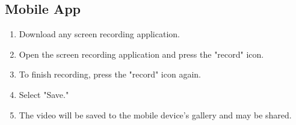 \subsection{Mobile App}
\begin{enumerate}
    \item Download any screen recording application. 
    \item Open the screen recording application and press the "record" icon.
    \item To finish recording, press the "record" icon again. 
    \item Select "Save."
    \item The video will be saved to the mobile device's gallery and may be shared.
\end{enumerate}
